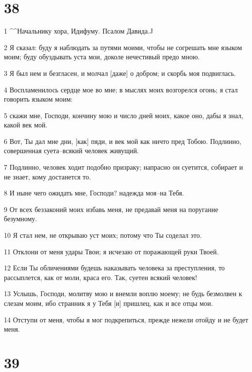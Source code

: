 \chapter{38}

\par 1 ^^Начальнику хора, Идифуму. Псалом Давида.^^
\par 2 Я сказал: буду я наблюдать за путями моими, чтобы не согрешать мне языком моим; буду обуздывать уста мои, доколе нечестивый предо мною.
\par 3 Я был нем и безгласен, и молчал [даже] о добром; и скорбь моя подвиглась.
\par 4 Воспламенилось сердце мое во мне; в мыслях моих возгорелся огонь; я стал говорить языком моим:
\par 5 скажи мне, Господи, кончину мою и число дней моих, какое оно, дабы я знал, какой век мой.
\par 6 Вот, Ты дал мне дни, [как] пяди, и век мой как ничто пред Тобою. Подлинно, совершенная суета--всякий человек живущий.
\par 7 Подлинно, человек ходит подобно призраку; напрасно он суетится, собирает и не знает, кому достанется то.
\par 8 И ныне чего ожидать мне, Господи? надежда моя--на Тебя.
\par 9 От всех беззаконий моих избавь меня, не предавай меня на поругание безумному.
\par 10 Я стал нем, не открываю уст моих; потому что Ты соделал это.
\par 11 Отклони от меня удары Твои; я исчезаю от поражающей руки Твоей.
\par 12 Если Ты обличениями будешь наказывать человека за преступления, то рассыплется, как от моли, краса его. Так, суетен всякий человек!
\par 13 Услышь, Господи, молитву мою и внемли воплю моему; не будь безмолвен к слезам моим, ибо странник я у Тебя [и] пришлец, как и все отцы мои.
\par 14 Отступи от меня, чтобы я мог подкрепиться, прежде нежели отойду и не будет меня.

\chapter{39}

